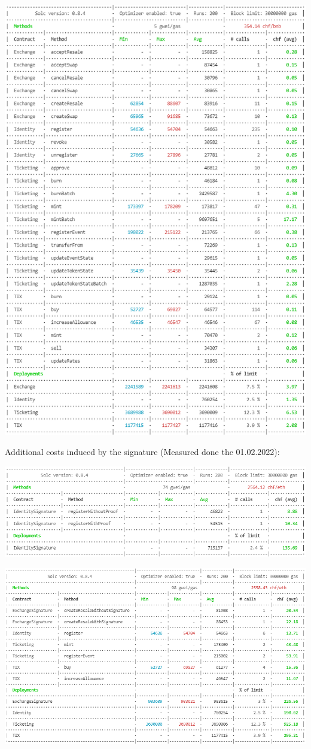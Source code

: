 \documentclass[a4paper,11pt,oneside]{report}
\begin{document}
\includegraphics[width=\textwidth]{marketplace_price_binance_01_02_2022.PNG}

Additional costs induced by the signature (Measured done the 01.02.2022):

\includegraphics[width=\textwidth]{identity_sig_price_overhead_ethereum_01_02_2022.PNG}

\includegraphics[width=\textwidth]{exchange_sig_price_overhead_ethereum_01_02_2022.PNG}
\end{document}
